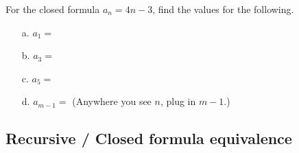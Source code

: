 \documentclass[a4paper,12pt]{book}
\newcounter{question}
\begin{document}
        \hrulefill

        \begin{questionNOGRADE}{\thequestion}

            For the closed formula $a_{n} = 4n - 3$,
            find the values for the following.

            \begin{itemize}
                \item[a.] $a_{1} = $    
                \item[b.] $a_{3} = $    
                \item[c.] $a_{5} = $    
                \item[d.] $a_{m-1} = $  (Anywhere you see $n$, plug in $m-1$.) \\
            \end{itemize}
            
        \end{questionNOGRADE}

    \newpage

    \subsection{Recursive / Closed formula equivalence}
\end{document}
